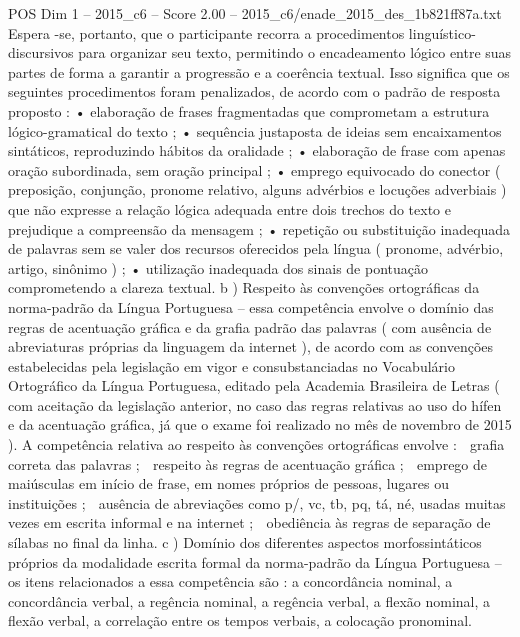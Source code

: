 \begin{textsample}{POS Dim 1 – 2015\_c6 – Score 2.00 – 2015\_c6/enade\_2015\_des\_1b821ff87a.txt}
Espera -se, portanto, que o participante recorra a procedimentos linguístico-discursivos para organizar seu texto, permitindo o encadeamento lógico entre suas partes de forma a garantir a progressão e a coerência textual.
Isso significa que os seguintes procedimentos foram penalizados, de acordo com o padrão de resposta proposto : • elaboração de frases fragmentadas que comprometam a estrutura lógico-gramatical do texto ; • sequência justaposta de ideias sem encaixamentos sintáticos, reproduzindo hábitos da oralidade ; • elaboração de frase com apenas oração subordinada, sem oração principal ; • emprego equivocado do conector ( preposição, conjunção, pronome relativo, alguns advérbios e locuções adverbiais ) que não expresse a relação lógica adequada entre dois trechos do texto e prejudique a compreensão da mensagem ; • repetição ou substituição inadequada de palavras sem se valer dos recursos oferecidos pela língua ( pronome, advérbio, artigo, sinônimo ) ; • utilização inadequada dos sinais de pontuação comprometendo a clareza textual. b ) Respeito às convenções ortográficas da norma-padrão da Língua Portuguesa – essa competência envolve o domínio das regras de acentuação gráfica e da grafia padrão das palavras ( com ausência de abreviaturas próprias da linguagem da internet ), de acordo com as convenções estabelecidas pela legislação em vigor e consubstanciadas no Vocabulário Ortográfico da Língua Portuguesa, editado pela Academia Brasileira de Letras ( com aceitação da legislação anterior, no caso das regras relativas ao uso do hífen e da acentuação gráfica, já que o exame foi realizado no mês de novembro de 2015 ).
A competência relativa ao respeito às convenções ortográficas envolve :  grafia correta das palavras ;  respeito às regras de acentuação gráfica ;  emprego de maiúsculas em início de frase, em nomes próprios de pessoas, lugares ou instituições ;  ausência de abreviações como p/, vc, tb, pq, tá, né, usadas muitas vezes em escrita informal e na internet ;  obediência às regras de separação de sílabas no final da linha. c ) Domínio dos diferentes aspectos morfossintáticos próprios da modalidade escrita formal da norma-padrão da Língua Portuguesa – os itens relacionados a essa competência são : a concordância nominal, a concordância verbal, a regência nominal, a regência verbal, a flexão nominal, a flexão verbal, a correlação entre os tempos verbais, a colocação pronominal.

\end{textsample}
